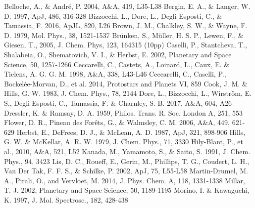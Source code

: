 \documentclass[twocolumn]{aastex61}
\begin{document}
\begin{thebibliography}{}
 Belloche, A., \& Andr{\'e}, P. 2004, A\&A, 419, L35-L38
 Bergin, E. A., \& Langer, W. D. 1997, ApJ, 486, 316-328
 Bizzocchi, L., Dore, L., Degli Esposti, C., \& Tamassia, F. 2016, ApJL, 820, L26
 Brown, J. M., Chalkley, S. W., \& Wayne, F. D. 1979, Mol. Phys., 38, 1521-1537
 Br{\"u}nken, S., M{\"u}ller, H. S. P., Lewen, F., \& Giesen, T., 2005, J. Chem. Phys, 123, 164315 (10pp) 
 Caselli, P., Stantcheva, T., Shalabeia, O., Shematovich, V. I., \& Herbst, E. 2002, Planetary and Space Science, 50, 1257-1266
 Ceccarelli, C., Castets, A., Loinard, L., Caux, E. \& Tielens, A. G. G. M. 1998, A\&A, 338, L43-L46
 Ceccarelli, C., Caselli, P., Bockelée-Morvan, D., et al. 2014, Protostars and Planets VI, 859
 Cook, J. M. \& Hills, G. W. 1983, J. Chem. Phys., 78, 2144
 Dore, L., Bizzocchi, L., Wirstr\"{o}m, E. S., Degli Esposti, C., Tamassia, F. \& Charnley, S. B. 2017, A\&A, 604, A26
 Dressler, K. \& Ramsay, D. A. 1959, Philos. Trans. R. Soc. London A, 251, 553
 Flower, D. R., Pineau des For{\^e}ts, G., \& Walmsley, C. M. 2006, A\&A, 449, 621-629
 Herbst, E., DeFrees, D. J., \& McLean, A. D. 1987, ApJ, 321, 898-906
 Hills, G. W. \& McKellar, A. R. W. 1979, J. Chem. Phys., 71, 3330
 Hily-Blant, P., et al., 2010, A\&A, 521, L52
 Kanada, M., Yamamoto, S., \& Saito, S. 1991, J. Chem. Phys., 94, 3423
 Lis, D. C., Roueff, E., Gerin, M., Phillips, T. G., Coudert, L. H., Van Der Tak, F. F. S., \& Schilke, P. 2002, ApJ, 75, L55-L58
 Martin-Drumel, M. A., Pirali, O., and  Vervloet, M. 2014, J. Phys. Chem. A, 118, 1331-1338
 Millar, T. J. 2002, Planetary and Space Science, 50, 1189-1195
 Morino, I. \& Kawaguchi, K. 1997, J. Mol. Spectrosc., 182, 428-438

\end{thebibliography}
\end{document}
